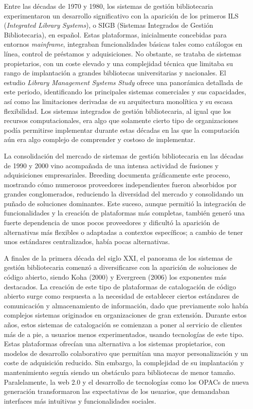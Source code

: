 Entre las décadas de 1970 y 1980, los sistemas de gestión bibliotecaria experimentaron un desarrollo significativo con la aparición de los primeros ILS (\textit{Integrated Library Systems}), o SIGB (Sistemas Integrados de Gestión Bibliotecaria), en español. Estas plataformas, inicialmente concebidas para entornos \textit{mainframe}, integraban funcionalidades básicas tales como catálogos en línea, control de préstamos y adquisiciones. No obstante, se trataba de sistemas propietarios, con un coste elevado y una complejidad técnica que limitaba su rango de implantación a grandes bibliotecas universitarias y nacionales. El estudio \textit{Library Management Systems Study} \parencite{jisc2008} ofrece una panorámica detallada de este periodo, identificando los principales sistemas comerciales y sus capacidades, así como las limitaciones derivadas de su arquitectura monolítica y su escasa flexibilidad. Los sistemas integrados de gestión bibliotecaria, al igual que los recursos computacionales, era algo que solamente cierto tipo de organizaciones podía permitirse implementar durante estas décadas en las que la computación aún era algo complejo de comprender y costoso de implementar.

La consolidación del mercado de sistemas de gestión bibliotecaria en las décadas de 1990 y 2000 vino acompañada de una intensa actividad de fusiones y adquisiciones empresariales. Breeding \parencite{breeding_history} documenta gráficamente este proceso, mostrando cómo numerosos proveedores independientes fueron absorbidos por grandes conglomerados, reduciendo la diversidad del mercado y consolidando un puñado de soluciones dominantes. Este suceso, aunque permitió la integración de funcionalidades y la creación de plataformas más completas, también generó una fuerte dependencia de unos pocos proveedores y dificultó la aparición de alternativas más flexibles o adaptadas a contextos específicos; a cambio de tener unos estándares centralizados, había pocas alternativas.

A finales de la primera década del siglo XXI, el panorama de los sistemas de gestión bibliotecaria comenzó a diversificarse con la aparición de soluciones de código abierto, siendo Koha (2000) y Evergreen (2006) los exponentes más destacados. La creación de este tipo de plataformas de catalogación de código abierto surge como respuesta a la necesidad de establecer ciertos estándares de comunicación y almacenamiento de información, dado que previamente solo había complejos sistemas originados en organizaciones de gran extensión. Durante estos años, estos sistemas de catalogación se comienzan a poner al servicio de clientes más de a pie, a usuarios menos experimentados, usando tecnologías de este tipo. Estas plataformas ofrecían una alternativa a los sistemas propietarios, con modelos de desarrollo colaborativo que permitían una mayor personalización y un coste de adquisición reducido. Sin embargo, la complejidad de su implantación y mantenimiento seguía siendo un obstáculo para bibliotecas de menor tamaño. Paralelamente, la web 2.0 y el desarrollo de tecnologías como los OPACs de nueva generación transformaron las expectativas de los usuarios, que demandaban interfaces más intuitivas y funcionalidades sociales.

